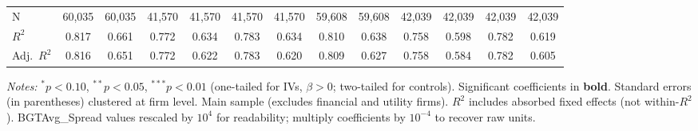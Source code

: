 \begin{landscape}
\begin{table}[H]
\begin{tabular}{lcccccccccccc}
\midrule
N & 60,035 & 60,035 & 41,570 & 41,570 & 41,570 & 41,570 & 59,608 & 59,608 & 42,039 & 42,039 & 42,039 & 42,039 \\
$R^2$ & 0.817 & 0.661 & 0.772 & 0.634 & 0.783 & 0.634 & 0.810 & 0.638 & 0.758 & 0.598 & 0.782 & 0.619 \\
Adj.~$R^2$ & 0.816 & 0.651 & 0.772 & 0.622 & 0.783 & 0.620 & 0.809 & 0.627 & 0.758 & 0.584 & 0.782 & 0.605 \\
\bottomrule
\end{tabular}
\begin{minipage}{\linewidth}
\vspace{2pt}\scriptsize
\textit{Notes:} $^{*}p<0.10$, $^{**}p<0.05$, $^{***}p<0.01$ (one-tailed for IVs, $\beta > 0$; two-tailed for controls).
 Significant coefficients in \textbf{bold}.
 Standard errors (in parentheses) clustered at firm level.
 Main sample (excludes financial and utility firms).
 $R^2$ includes absorbed fixed effects (not within-$R^2$).
 BGTAvg\_Spread values rescaled by $10^4$ for readability; multiply coefficients by $10^{-4}$ to recover raw units.
\end{minipage}
\end{table}
\end{landscape}